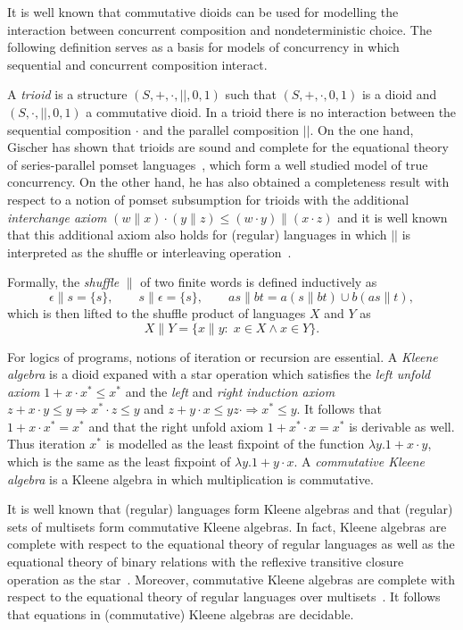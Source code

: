\documentclass{llncs}
\begin{document}
It is well known that commutative dioids can be used for modelling the
interaction between concurrent composition and nondeterministic
choice. The following definition serves as a basis for models of
concurrency in which sequential and concurrent composition
interact.

A \emph{trioid} is a structure $(S,+,\cdot,||,0,1)$ such that
$(S,+,\cdot,0,1)$ is a dioid and $(S,\cdot,||,0,1)$ a commutative
dioid. In a trioid there is no interaction between the sequential
composition $\cdot$ and the parallel composition $||$. On the one
hand, Gischer has shown that trioids are sound and complete for the
equational theory of series-parallel pomset languages~\cite{gischer_equational_1988},
which form a well studied model of true concurrency. On the other
hand, he has also obtained a completeness result with respect to a
notion of pomset subsumption for trioids with the additional
\emph{interchange axiom} $(w \| x) \cdot (y \| z) \le (w \cdot y) \|
(x \cdot z)$ and it is well known that this additional axiom also
holds for (regular) languages in which $||$ is interpreted as the
shuffle or interleaving operation~\cite{gischer_shuffle_1981}.

Formally, the \emph{shuffle} $\|$ of two finite words is defined
inductively as
\begin{equation*}
\epsilon \| s = \{s\}, \qquad s \| \epsilon = \{s\},\qquad
as \| bt = a(s \| bt) \cup b(as \| t),
\end{equation*}
which is then lifted to the shuffle product of languages $X$ and $Y$
as
\begin{equation*}
X \| Y = \{x \| y:\; x \in X \land x \in Y\}.
\end{equation*}

For logics of programs, notions of iteration or recursion are
essential. A \emph{Kleene algebra} is a dioid expaned with a star
operation which satisfies the \emph{left unfold axiom} $1 + x\cdot
x^*\le x^*$ and the \emph{left} and \emph{right induction axiom} $z+x
\cdot y \le y\Rightarrow x^*\cdot z \le y$ and $z + y\cdot x \le y
z\cdot \Rightarrow x^* \le y$. It follows that $1+x\cdot x^* = x^*$
and that the right unfold axiom $1+x^*\cdot x=x^*$ is derivable as
well. Thus iteration $x^\ast$ is modelled as the least fixpoint of the
function $\lambda y. 1+x\cdot y$, which is the same as the least
fixpoint of $\lambda y.1+ y\cdot x$. A \emph{commutative Kleene
  algebra} is a Kleene algebra in which multiplication is commutative.

It is well known that (regular) languages form Kleene algebras and
that (regular) sets of multisets form commutative Kleene algebras. In
fact, Kleene algebras are complete with respect to the equational
theory of regular languages as well as the equational theory of binary
relations with the reflexive transitive closure operation as the
star~\cite{kozen_completeness_1994}. Moreover, commutative Kleene
algebras are complete with respect to the equational theory of regular
languages over multisets~\cite{conway_regular_1971}. It follows that
equations in (commutative) Kleene algebras are decidable.
\end{document}
